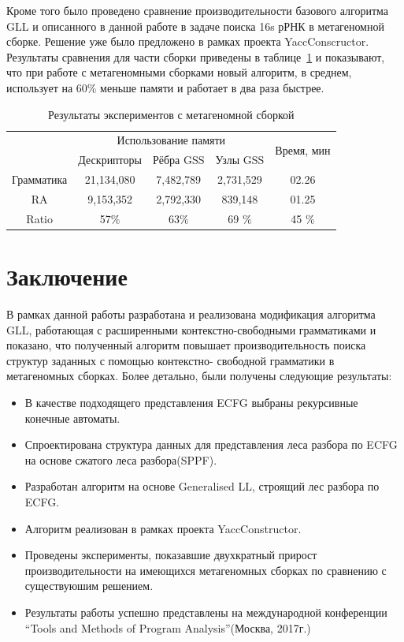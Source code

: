 \documentclass[14pt]{matmex-diploma-custom}
\begin{document}
    Кроме того было проведено сравнение производительности базового алгоритма GLL и описанного в данной 
    работе в задаче поиска 16s рРНК в метагеномной сборке. Решение уже было предложено в рамках проекта YaccConscructor.
    Результаты сравнения для части сборки приведены в таблице~\ref{expTable1} и показывают, что при работе с метагеномными сборками новый
    алгоритм, в среднем, использует на 60\% меньше памяти и работает в два раза быстрее.
    
    \begin{table}[h]
        \begin{tabular}{ | c | c | c | c | c | }
            \hline
            \multirow{2}{*}[-1ex]{} &\multicolumn{3}{c|}{Использование памяти} & \multirow{2}{*}[-1ex]{Время, мин } \\
            \cline{2-4}
            &  Дескрипторы & Рёбра GSS & Узлы GSS &  \\ \hline
            Грамматика  &  21,134,080       & 7,482,789      & 2,731,529      & 02.26  \\ \hline
            RA &  9,153,352        &  2,792,330     & 839,148        & 01.25  \\ \hline \hline
            Ratio   &  57$\%$       & 63$\%$     & 69 $\%$    &  45 $\%$ \\ \hline
        \end{tabular}
        \caption{Результаты экспериментов с метагеномной сборкой}
        \label{expTable1}
    \end{table}
	
	\section*{Заключение}
	В рамках данной работы разработана и реализована модификация алгоритма GLL,
	работающая с расширенными контекстно-свободными грамматиками и показано, что полученный
	алгоритм повышает производительность поиска структур заданных с помощью контекстно- свободной
	грамматики в метагеномных сборках. Более детально, были получены следующие результаты:
	\begin{itemize}
		\item В качестве подходящего представления ECFG выбраны рекурсивные конечные автоматы.
		\item Спроектирована структура данных для представления леса разбора по ECFG 
		на основе сжатого леса разбора(SPPF).
		\item Разработан алгоритм на основе Generalised LL, строящий лес разбора по ECFG.
		\item Алгоритм реализован в рамках проекта YaccConstructor.
		\item Проведены эксперименты, показавшие двухкратный прирост 
		производительности на имеющихся метагеномных сборках по сравнению 
		с существуюшим решением.
		\item Результаты работы успешно представлены на международной конференции
		``Tools and Methods of Program Analysis''(Москва, 2017г.)
	\end{itemize}
	
	\setmonofont[Mapping=tex-text]{CMU Typewriter Text}
	
	
	
\end{document}
